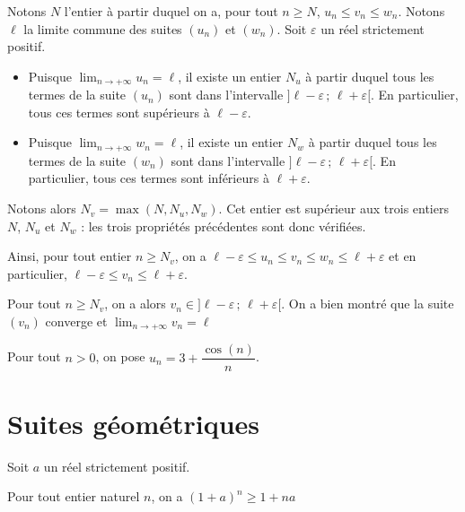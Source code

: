 \documentclass[11pt,fleqn, openany]{book} %
\begin{document}
\begin{demonstration} Notons $N$ l'entier à partir duquel on a, pour tout $n\geqslant N$, $u_n \leqslant v_n \leqslant w_n$. Notons $\ell$ la limite commune des suites $(u_n)$ et $(w_n)$. Soit $\varepsilon$ un réel strictement positif.
\begin{itemize}
\item Puisque $\displaystyle \lim_{n \to +\infty} u_n=\ell$, il existe un entier $N_u$ à partir duquel tous les termes de la suite $(u_n)$ sont dans l'intervalle $]\ell-\varepsilon\, ; \, \ell +\varepsilon [$. En particulier, tous ces termes sont supérieurs à $\ell-\varepsilon$.
\item Puisque $\displaystyle \lim_{n \to +\infty} w_n=\ell$, il existe un entier $N_w$ à partir duquel tous les termes de la suite $(w_n)$ sont dans l'intervalle $]\ell-\varepsilon\, ; \, \ell +\varepsilon [$. En particulier, tous ces termes sont inférieurs à $\ell+\varepsilon$.

\end{itemize}

Notons alors $N_v=\max(N,N_u, N_w)$. Cet entier est supérieur aux trois entiers $N$, $N_u$ et $N_w$ : les trois propriétés précédentes sont donc vérifiées.

Ainsi, pour tout entier $n\geqslant N_v$, on a $\ell-\varepsilon \leqslant u_n \leqslant v_n \leqslant w_n \leqslant \ell+\varepsilon$ et en particulier,  $\ell-\varepsilon\leqslant v_n \leqslant \ell+\varepsilon$.

Pour tout $n \geqslant N_v$, on a alors $v_n \in ]\ell-\varepsilon\, ; \, \ell +\varepsilon [$. On a bien montré que la suite $(v_n)$ converge et $\displaystyle \lim_{n \to +\infty} v_n = \ell$\end{demonstration}
\newpage 
\begin{example} Pour tout $n>0$, on pose $u_n=3+\dfrac{\cos (n)}{n}$.

\vskip50pt \end{example}



\section{Suites géométriques}


\begin{proposition} Soit $a$ un réel strictement positif. 

Pour tout entier naturel $n$, on a $(1+a)^n \geqslant 1+na$\end{proposition}
\end{document}
